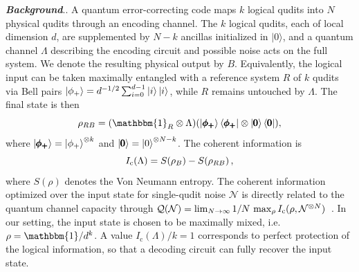 \documentclass[aps,prl,twocolumn,superscriptaddress,numerical]{revtex4-2}
\newcommand{\Ic}{I_\mathrm{\rm c}} %
\newcommand{\Noise}{\mathcal{N}}
\newcommand{\Id}{\mathbbm{1}}
\renewcommand{\section}[1]{\textbf{\emph{#1}}.\!}
\begin{document}
\section{Background}. A quantum error-correcting code maps $k$ logical qudits into $N$ physical qudits through an encoding channel. The $k$ logical qudits, each of local dimension $d$, are supplemented by $N-k$ ancillas initialized in $|0\rangle$, and a quantum channel $\Lambda$ describing the encoding circuit and possible noise acts on the full system. We denote the resulting physical output by $B$. Equivalently, the logical input can be taken maximally entangled with a reference system $R$ of $k$ qudits via Bell pairs $\ket{\phi_+}=d^{-1/2}\sum_{i=0}^{d-1}\ket{i}\ket{i}$, while $R$ remains untouched by $\Lambda$. The final state is then
\[
\rho_{RB}=(\Id_R\otimes \Lambda)(\ket{\pmb{\phi_+}}\bra{\pmb{\phi_+}}\otimes \ket{\pmb{0}}\bra{\pmb{0}}),
\]
where $\ket{\pmb{\phi_+}}=\ket{\phi_+}^{\otimes k}$ and $\ket{\pmb{0}}=\ket{0}^{\otimes N-k}$. The coherent information is
\begin{equation}\label{eq:Ic_def}
    \Ic(\Lambda)=S(\rho_{B})-S(\rho_{RB})\, ,
\end{equation}
where $S(\rho)$ denotes the Von Neumann entropy. The coherent information optimized over the input state for single-qudit noise $\mathcal{N}$ is directly related to the quantum channel capacity through
$\mathcal{Q}(\Noise)=\lim_{N \to \infty } 1/N \, \max_\rho \Ic(\rho,\Noise^{\otimes N})$~\cite{PhysRevA.55.1613,devetak2004capacityquantumchannelsimultaneous}. In our setting, the input state is chosen to be maximally mixed, i.e.\ $\rho=\Id/d^k$. A value $I_{\mathrm c}(\Lambda)/k=1$ corresponds to perfect protection of the logical information, so that a decoding circuit can fully recover the input state.
\end{document}
